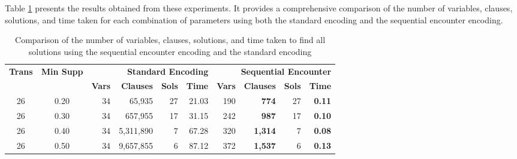 Table \ref{tab:4_1} presents the results obtained from these experiments.
It provides a comprehensive comparison of the number of variables, clauses, solutions, and time taken for each combination of parameters using both the standard encoding and the sequential encounter encoding.
\begin{table}[H]
    \centering
    \caption{Comparison of the number of variables, clauses, solutions, and time taken to find all solutions using the sequential encounter encoding and the standard encoding}
    \label{tab:4_1}
    \begin{tabular}{|c|c|r|r|r|r|r|r|r|r|}
        \hline
        \multirow{2}{*}{\textbf{Trans}} & \multirow{2}{*}{\textbf{Min Supp}} & \multicolumn{4}{r|}{\textbf{Standard Encoding}} & \multicolumn{4}{r|}{\textbf{Sequential Encounter}}                                                                                                    \\ \cline{3-10}
                                        &                                    & \textbf{Vars}                                   & \textbf{Clauses}                                   & \textbf{Sols} & \textbf{Time} & \textbf{Vars} & \textbf{Clauses} & \textbf{Sols} & \textbf{Time} \\ \hline
        26                              & 0.20                               & 34                                              & 65,935                                             & 27            & 21.03         & 190           & \textbf{ 774}    & 27            & \textbf{0.11} \\ \hline
        26                              & 0.30                               & 34                                              & 657,955                                            & 17            & 31.15         & 242           & \textbf{ 987}    & 17            & \textbf{0.10} \\ \hline
        26                              & 0.40                               & 34                                              & 5,311,890                                          & 7             & 67.28         & 320           & \textbf{1,314}   & 7             & \textbf{0.08} \\ \hline
        26                              & 0.50                               & 34                                              & 9,657,855                                          & 6             & 87.12         & 372           & \textbf{1,537}   & 6             & \textbf{0.13} \\ \hline

\end{tabular}
\end{table}
